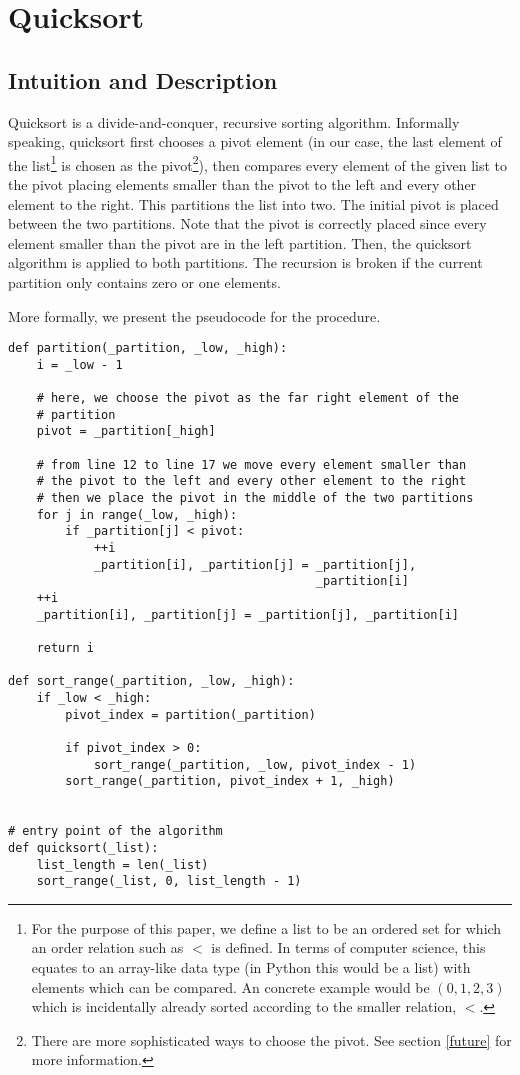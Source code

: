 \section{Quicksort}
\subsection{Intuition and Description}
Quicksort is a divide-and-conquer, recursive sorting algorithm.\cite[p.~145]{bib:introductiontoalgorithms} Informally speaking, quicksort first chooses a pivot element (in our case, the last element of the list\footnote{For the purpose of this paper, we define a list to be an ordered set for which an order relation such as \(<\) is defined. In terms of computer science, this equates to an array-like data type (in Python this would be a list) with elements which can be compared. An concrete example would be \((0, 1, 2, 3)\) which is incidentally already sorted according to the smaller relation, \(<\).} is chosen as the pivot\footnote{There are more sophisticated ways to choose the pivot. See section \ref{future} for more information.}), then compares every element of the given list to the pivot placing elements smaller than the pivot to the left and every other element to the right. This partitions the list into two. The initial pivot is placed between the two partitions. Note that the pivot is correctly placed since every element smaller than the pivot are in the left partition. Then, the quicksort algorithm is applied to both partitions. The recursion is broken if the current partition only contains zero or one elements.

More formally, we present the pseudocode for the procedure.
\begin{lstlisting}
def partition(_partition, _low, _high):
    i = _low - 1

    # here, we choose the pivot as the far right element of the
    # partition
    pivot = _partition[_high]

    # from line 12 to line 17 we move every element smaller than 
    # the pivot to the left and every other element to the right
    # then we place the pivot in the middle of the two partitions
    for j in range(_low, _high):
        if _partition[j] < pivot:
            ++i
            _partition[i], _partition[j] = _partition[j], 
                                           _partition[i]
    ++i
    _partition[i], _partition[j] = _partition[j], _partition[i]

    return i

def sort_range(_partition, _low, _high):
    if _low < _high:
        pivot_index = partition(_partition)

        if pivot_index > 0:
            sort_range(_partition, _low, pivot_index - 1)
        sort_range(_partition, pivot_index + 1, _high)


# entry point of the algorithm
def quicksort(_list):
    list_length = len(_list)
    sort_range(_list, 0, list_length - 1)

\end{lstlisting}

